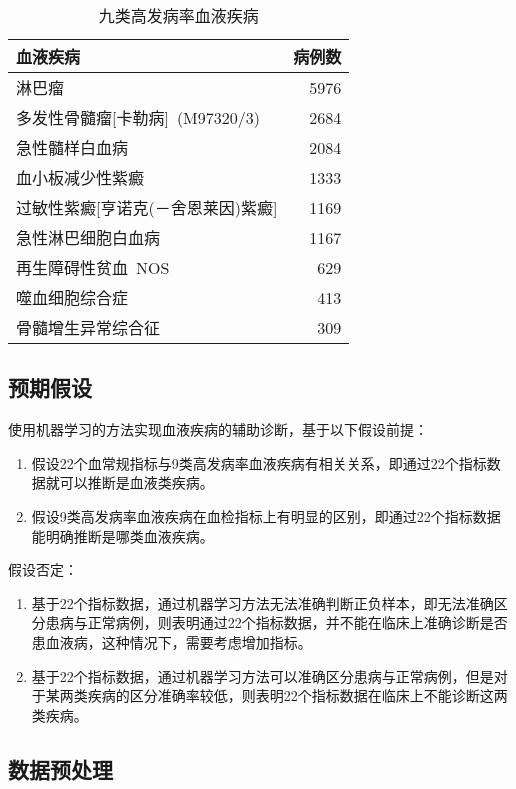 \documentclass[UTF8,a4paper,12pt, onecolumn]{ctexart}
\begin{document}
\begin{table}
\centering
\begin{tabular}{|l|r|}
\toprule
血液疾病 & 病例数  \\ 
\midrule
淋巴瘤 & 5976   \\ 
\hline
多发性骨髓瘤[卡勒病] (M97320/3) & 2684   \\ 
\hline
急性髓样白血病 & 2084 \\ 
\hline
血小板减少性紫癜 & 1333 \\
\hline
过敏性紫癜[亨诺克(－舍恩莱因)紫癜] & 1169 \\
\hline
急性淋巴细胞白血病 & 1167 \\
\hline
再生障碍性贫血 NOS & 629 \\
\hline
噬血细胞综合症 & 413 \\
\hline
骨髓增生异常综合征 & 309 \\
\bottomrule
\end{tabular}
\caption{九类高发病率血液疾病}
\label{tb:9boold}
\end{table}

\subsection{预期假设}

使用机器学习的方法实现血液疾病的辅助诊断，基于以下假设前提：

\begin{enumerate}
  \item 假设22个血常规指标与9类高发病率血液疾病有相关关系，即通过22个指标数据就可以推断是血液类疾病。
  \item 假设9类高发病率血液疾病在血检指标上有明显的区别，即通过22个指标数据能明确推断是哪类血液疾病。
\end{enumerate}

假设否定：

\begin{enumerate}
  \item 基于22个指标数据，通过机器学习方法无法准确判断正负样本，即无法准确区分患病与正常病例，则表明通过22个指标数据，并不能在临床上准确诊断是否患血液病，这种情况下，需要考虑增加指标。
  \item 基于22个指标数据，通过机器学习方法可以准确区分患病与正常病例，但是对于某两类疾病的区分准确率较低，则表明22个指标数据在临床上不能诊断这两类疾病。
\end{enumerate}



\subsection{数据预处理}
\end{document}
